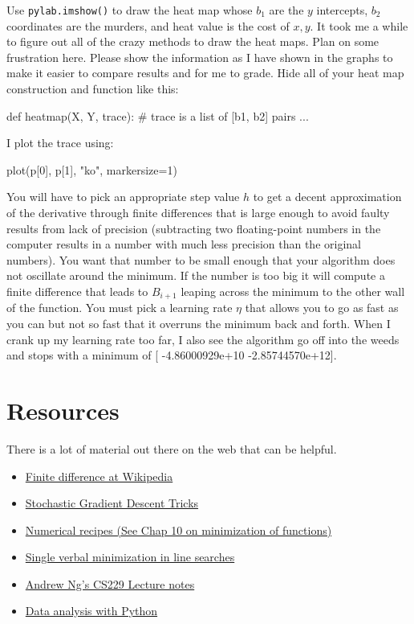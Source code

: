\begin{fullwidth}
Use {\tt pylab.imshow()} to draw the heat map whose $b_1$ are the $y$ intercepts, $b_2$ coordinates are the murders, and heat value is the cost of $x,y$.  It took me a while to figure out all of the crazy methods to draw the heat maps.  Plan on some frustration here.  Please show the information as I have shown in the graphs to make it easier to compare results and for me to grade. Hide all of your heat map construction and function like this:

\begin{pyverbatim}
def heatmap(X, Y, trace): # trace is a list of [b1, b2] pairs
    ...
\end{pyverbatim}

\noindent I plot the trace using:

\begin{pyverbatim}
plot(p[0], p[1], "ko", markersize=1)
\end{pyverbatim}

You will have to pick an appropriate step value $h$ to get a decent approximation of the derivative through finite differences that is large enough to avoid faulty results from lack of precision (subtracting two floating-point numbers in the computer results in a number with much less precision than the original numbers). You want that number to be small enough that your algorithm does not oscillate around the minimum. If the number is too big it will compute a finite difference that leads to $B_{i+1}$ leaping across the minimum to the other wall of the function. You must pick a learning rate $\eta$ that allows you to go as fast as you can but not so fast that it overruns the minimum back and forth. When I crank up my learning rate too far, I also see the algorithm go off into the weeds and stops with a minimum of [ -4.86000929e+10  -2.85744570e+12].

\section{Resources}

There is a lot of material out there on the web that can be helpful.

\begin{itemize}
\item \href{http://en.wikipedia.org/wiki/Finite_difference}{Finite difference at Wikipedia}
\item \href{http://research.microsoft.com/pubs/192769/tricks-2012.pdf}{Stochastic Gradient Descent Tricks}
\item \href{http://apps.nrbook.com/fortran/index.html}{Numerical recipes (See Chap 10 on minimization of functions)}
\item \href{http://adl.stanford.edu/aa222/Lecture_Notes_files/AA222-Lecture2.pdf}{Single verbal minimization in line searches}
\item \href{http://cs229.stanford.edu/notes/cs229-notes1.pdf}{Andrew Ng's CS229 Lecture notes}
\item \href{http://people.duke.edu/~ccc14/pcfb/analysis.html}{Data analysis with Python}
\end{itemize}


\end{fullwidth}
